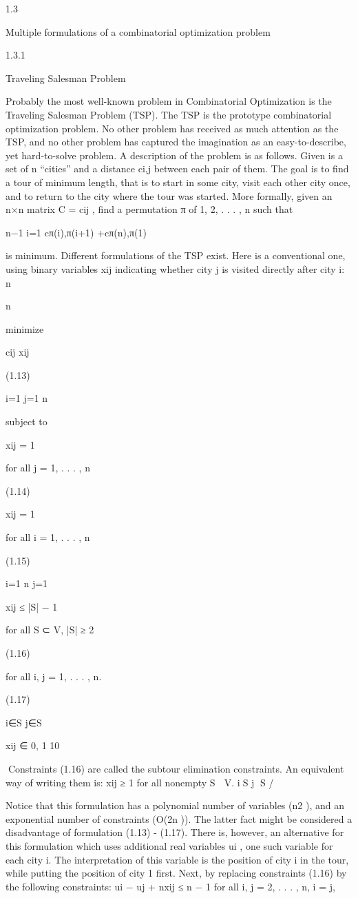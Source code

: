 \documentclass[titlepage]{book}
\begin{document}
1.3

Multiple formulations of a combinatorial optimization problem

1.3.1

Traveling Salesman Problem

Probably the most well-known problem in Combinatorial Optimization is the Traveling Salesman Problem
(TSP). The TSP is the prototype combinatorial optimization problem. No other problem has received as
much attention as the TSP, and no other problem has captured the imagination as an easy-to-describe,
yet hard-to-solve problem. A description of the problem is as follows. Given is a set of n “cities” and a
distance ci,j between each pair of them. The goal is to find a tour of minimum length, that is to start in
some city, visit each other city once, and to return to the city where the tour was started. More formally,
given an n×n matrix C = cij , find a permutation π of {1, 2, . . . , n} such that

n−1
i=1 cπ(i),π(i+1) +cπ(n),π(1)

is minimum.
Different formulations of the TSP exist. Here is a conventional one, using binary variables xij indicating
whether city j is visited directly after city i:
n

n

minimize

cij xij

(1.13)

i=1 j=1
n

subject to

xij = 1

for all j = 1, . . . , n

(1.14)

xij = 1

for all i = 1, . . . , n

(1.15)

i=1
n
j=1

xij ≤ |S| − 1

for all S ⊂ V, |S| ≥ 2

(1.16)

for all i, j = 1, . . . , n.

(1.17)

i∈S j∈S

xij ∈ {0, 1}
10

Constraints (1.16) are called the subtour elimination constraints. An equivalent way of writing them is:
xij ≥ 1 for all nonempty S ⊂ V.
i∈S j ∈S
/

Notice that this formulation has a polynomial number of variables (n2 ), and an exponential number of
constraints (O(2n )). The latter fact might be considered a disadvantage of formulation (1.13) - (1.17).
There is, however, an alternative for this formulation which uses additional real variables ui , one such
variable for each city i. The interpretation of this variable is the position of city i in the tour, while
putting the position of city 1 first. Next, by replacing constraints (1.16) by the following constraints:
ui − uj + nxij ≤ n − 1 for all i, j = 2, . . . , n, i = j,
\end{document}
